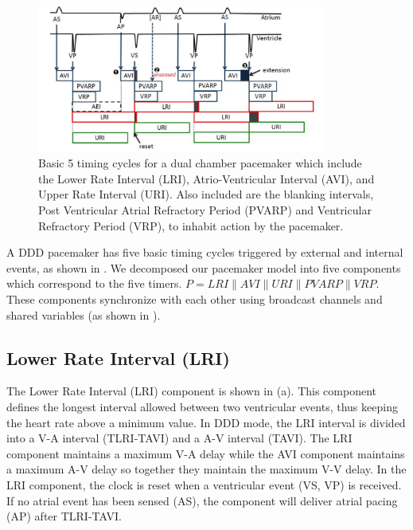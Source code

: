 \begin{figure}[!b]
\center
\includegraphics[width=0.85\textwidth]{figs/PM_timers.pdf}
\caption{Basic 5 timing cycles for a dual chamber pacemaker which include the Lower Rate Interval (LRI),  Atrio-Ventricular Interval (AVI), and Upper Rate Interval (URI). Also included are the blanking intervals, Post Ventricular Atrial Refractory Period (PVARP) and Ventricular Refractory Period (VRP), to inhabit action by the pacemaker.}
\label{fig:PMtimers}

\end{figure} 
A DDD pacemaker has five basic timing cycles triggered by external and internal events, as shown in . We decomposed our pacemaker model into five components which correspond to the five timers. $P=LRI\| AVI\| URI\| PVARP\| VRP$. These components synchronize with each other using broadcast channels and shared variables (as shown in ). 

\subsection{Lower Rate Interval (LRI)}
The Lower Rate Interval (LRI) component is shown in (a). This component defines the longest interval allowed between two ventricular events, thus keeping the heart rate above a minimum value. In DDD mode, the LRI interval is divided into a V-A interval (TLRI-TAVI) and a A-V interval (TAVI). The LRI component maintains a maximum V-A delay while the AVI component maintains a maximum A-V delay so together they maintain the maximum V-V delay. In the LRI component, the clock is reset when a ventricular event \textsf{(VS, VP)} is received. If no atrial event has been sensed \textsf{(AS)}, the component will deliver atrial pacing \textsf{(AP)} after TLRI-TAVI. 

